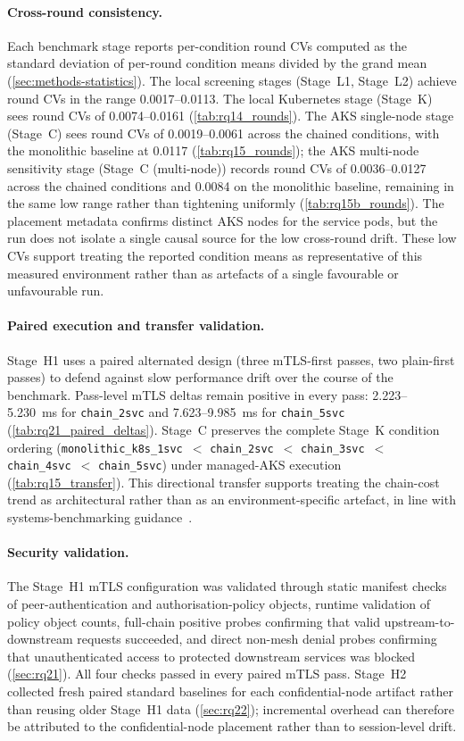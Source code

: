 \paragraph{Cross-round consistency.}
Each benchmark stage reports per-condition round CVs computed as the standard
deviation of per-round condition means divided by the grand mean
(\cref{sec:methods-statistics}). The local screening stages (Stage~L1, Stage~L2)
achieve round CVs in the range 0.0017--0.0113. The local Kubernetes stage
(Stage~K) sees round CVs of 0.0074--0.0161 (\cref{tab:rq14_rounds}). The AKS
single-node stage (Stage~C) sees round CVs of 0.0019--0.0061 across the chained
conditions, with the monolithic baseline at 0.0117 (\cref{tab:rq15_rounds}); the
AKS multi-node sensitivity stage (Stage~C (multi-node)) records round CVs of
0.0036--0.0127 across the chained conditions and 0.0084 on the monolithic
baseline, remaining in the same low range rather than tightening uniformly
(\cref{tab:rq15b_rounds}). The placement metadata confirms distinct AKS nodes
for the service pods, but the run does not isolate a single causal source for
the low cross-round drift. These low CVs support treating the reported
condition means as representative of this measured environment rather than as
artefacts of a single favourable or unfavourable run.

\paragraph{Paired execution and transfer validation.}
Stage~H1 uses a paired alternated design (three mTLS-first passes, two
plain-first passes) to defend against slow performance drift over the course
of the benchmark. Pass-level mTLS deltas remain positive in every pass:
2.223--5.230~ms for \texttt{chain\_2svc} and 7.623--9.985~ms for
\texttt{chain\_5svc} (\cref{tab:rq21_paired_deltas}). Stage~C preserves the
complete Stage~K condition ordering (\texttt{monolithic\_k8s\_1svc}~$<$
\texttt{chain\_2svc}~$<$ \texttt{chain\_3svc}~$<$ \texttt{chain\_4svc}~$<$
\texttt{chain\_5svc}) under managed-AKS execution
(\cref{tab:rq15_transfer}). This directional transfer supports treating the
chain-cost trend as architectural rather than as an environment-specific
artefact, in line with systems-benchmarking
guidance~\cite{benchmarking_sc15}.

\paragraph{Security validation.}
The Stage~H1 mTLS configuration was validated through static manifest checks of
peer-authentication and authorisation-policy objects, runtime validation of
policy object counts, full-chain positive probes confirming that valid
upstream-to-downstream requests succeeded, and direct non-mesh denial probes
confirming that unauthenticated access to protected downstream services was
blocked (\cref{sec:rq21}). All four checks passed in every paired mTLS
pass. Stage~H2 collected fresh paired standard baselines for each
confidential-node artifact rather than reusing older Stage~H1 data
(\cref{sec:rq22}); incremental overhead can therefore be attributed to the
confidential-node placement rather than to session-level drift.

